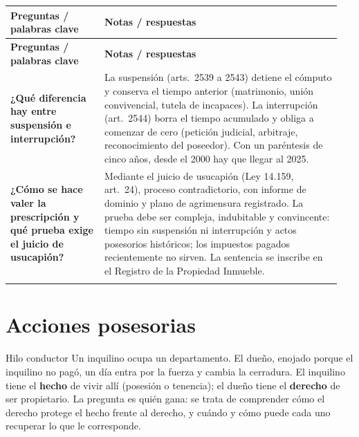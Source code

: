 \documentclass[12pt,oneside]{book}
\makeatletter
\newenvironment{cornell}{%
    \par\vspace{0.5em}
    \noindent
    \begin{longtable}{@{}>{\raggedright\arraybackslash}p{0.27\linewidth}
                         >{\raggedright\arraybackslash}p{0.68\linewidth}@{}}
    \toprule
    \textbf{Preguntas / palabras clave} & \textbf{Notas / respuestas} \\
    \midrule
    \endfirsthead
    \toprule
    \textbf{Preguntas / palabras clave} & \textbf{Notas / respuestas} \\
    \midrule
    \endhead
}{%
    \bottomrule
    \end{longtable}
}
\newcommand{\cornellsummary}[1]{%
    \midrule
    \multicolumn{2}{@{}p{\dimexpr0.95\linewidth+2\tabcolsep\relax}@{}}{%
        \vspace{0.2em}\textbf{Resumen:} #1\vspace{0.2em}} \\
}
\makeatother
\begin{document}
\begin{cornell}
\textbf{¿Qué diferencia hay entre suspensión e interrupción?} &
La suspensión (arts.~2539 a 2543) detiene el cómputo y conserva el tiempo anterior (matrimonio, unión convivencial, tutela de incapaces). La interrupción (art.~2544) borra el tiempo acumulado y obliga a comenzar de cero (petición judicial, arbitraje, reconocimiento del poseedor). Con un paréntesis de cinco años, desde el 2000 hay que llegar al 2025. \\

\textbf{¿Cómo se hace valer la prescripción y qué prueba exige el juicio de usucapión?} &
Mediante el juicio de usucapión (Ley 14.159, art.~24), proceso contradictorio, con informe de dominio y plano de agrimensura registrado. La prueba debe ser compleja, indubitable y convincente: tiempo sin suspensión ni interrupción y actos posesorios históricos; los impuestos pagados recientemente no sirven. La sentencia se inscribe en el Registro de la Propiedad Inmueble. \\

\cornellsummary{La prescripción adquisitiva transforma una relación de hecho en derecho real por el transcurso del tiempo con una posesión de cierta calidad. La larga exige veinte años sin título ni buena fe; la breve, diez años con justo título y buena fe. La suspensión detiene el cómputo y la interrupción lo borra. Para que la prescripción cumplida sea oponible a terceros debe obtenerse sentencia en el juicio de usucapión e inscribirla en el Registro. Su fundamento es el orden público, la función social de la propiedad y la seguridad jurídica.}
\end{cornell}

\chapter{Acciones posesorias}\label{cap:posesorias}

\begin{example}{Hilo conductor}
Un inquilino ocupa un departamento. El dueño, enojado porque el inquilino no pagó, un día entra por la fuerza y cambia la cerradura. El inquilino tiene el \textbf{hecho} de vivir allí (posesión o tenencia); el dueño tiene el \textbf{derecho} de ser propietario. La pregunta es quién gana: se trata de comprender cómo el derecho protege el hecho frente al derecho, y cuándo y cómo puede cada uno recuperar lo que le corresponde.
\end{example}
\end{document}
